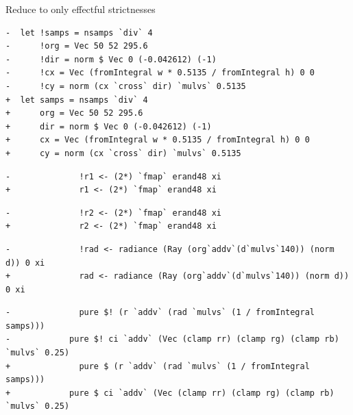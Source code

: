 \documentclass[8pt]{beamer}
\begin{document}
\begin{frame}[fragile]{Reduce to only effectful strictnesses}
\begin{verbatim}
-  let !samps = nsamps `div` 4
-      !org = Vec 50 52 295.6
-      !dir = norm $ Vec 0 (-0.042612) (-1)
-      !cx = Vec (fromIntegral w * 0.5135 / fromIntegral h) 0 0
-      !cy = norm (cx `cross` dir) `mulvs` 0.5135
+  let samps = nsamps `div` 4
+      org = Vec 50 52 295.6
+      dir = norm $ Vec 0 (-0.042612) (-1)
+      cx = Vec (fromIntegral w * 0.5135 / fromIntegral h) 0 0
+      cy = norm (cx `cross` dir) `mulvs` 0.5135
\end{verbatim}
\begin{verbatim}
-              !r1 <- (2*) `fmap` erand48 xi
+              r1 <- (2*) `fmap` erand48 xi
\end{verbatim}

\begin{verbatim}
-              !r2 <- (2*) `fmap` erand48 xi
+              r2 <- (2*) `fmap` erand48 xi
\end{verbatim}

\begin{verbatim}
-              !rad <- radiance (Ray (org`addv`(d`mulvs`140)) (norm d)) 0 xi
+              rad <- radiance (Ray (org`addv`(d`mulvs`140)) (norm d)) 0 xi
\end{verbatim}

\begin{verbatim}
-              pure $! (r `addv` (rad `mulvs` (1 / fromIntegral samps)))
-            pure $! ci `addv` (Vec (clamp rr) (clamp rg) (clamp rb) `mulvs` 0.25)
+              pure $ (r `addv` (rad `mulvs` (1 / fromIntegral samps)))
+            pure $ ci `addv` (Vec (clamp rr) (clamp rg) (clamp rb) `mulvs` 0.25)
\end{verbatim}

\end{frame}
\end{document}
